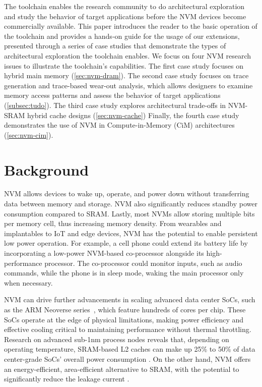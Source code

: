 \documentclass[manuscript,screen]{acmart}
\begin{document}
The toolchain enables the research community to do architectural exploration and study the behavior of target applications before the NVM devices become commercially available. 
This paper introduces the reader to the basic operation of the toolchain and provides a hands-on guide for the usage of our extensions, presented through a series of case studies that demonstrate the types of architectural exploration the toolchain enables.
We focus on four NVM research issues to illustrate the toolchain’s capabilities.
The first case study focuses on hybrid main memory (\cref{sec:nvm-dram}).
The second case study focuses on trace generation and trace-based wear-out analysis, which allows designers to examine memory access patterns and assess the behavior of target applications (\cref{subsec:tudo}).
The third case study explores architectural trade-offs in NVM-SRAM hybrid cache designs (\cref{sec:nvm-cache})
Finally, the fourth case study demonstrates the use of NVM in Compute-in-Memory (CiM) architectures (\cref{sec:nvm-cim}). 

\section{Background}\label{sec:Background}


NVM allows devices to wake up, operate, and power down without transferring data between memory and storage. NVM also significantly reduces standby power consumption compared to SRAM.  Lastly, most NVMs allow storing multiple bits per memory cell, thus increasing memory density.
From wearables and implantables to IoT and edge devices, NVM has the potential to enable persistent low power operation.
For example, a cell phone could extend its battery life by incorporating a low-power NVM-based co-processor alongside its high-performance processor.
The co-processor could monitor inputs, such as audio commands, while the phone is in sleep mode, waking the main processor only when necessary.

NVM can drive further advancements in scaling advanced data center SoCs, such as the ARM Neoverse series~\cite{ArmN1}, which feature hundreds of cores per chip. These SoCs operate at the edge of physical limitations, making power efficiency and effective cooling critical to maintaining performance without thermal throttling.  Research on advanced sub-1nm process nodes reveals that, depending on operating temperature, SRAM-based L2 caches can make up 25\% to 50\% of data center-grade SoCs' overall power consumption \cite{thermal_soc:24}.  On the other hand, NVM offers an energy-efficient, area-efficient alternative to SRAM, with the potential to significantly reduce the leakage current \cite{10750212}.
\end{document}
